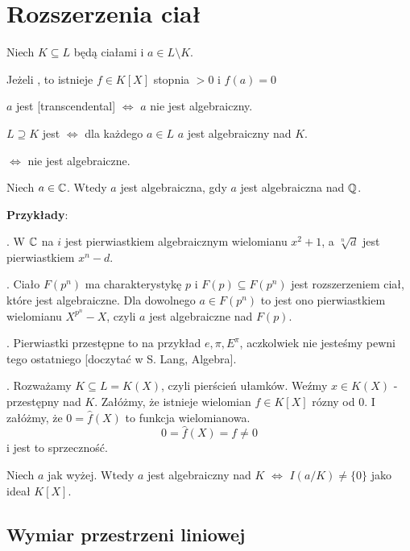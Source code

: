 \section{Rozszerzenia ciał}

\begin{definicja}
Niech $K\subseteq L$ będą ciałami i $a\in L\setminus K$.

\indent \point Jeżeli , to istnieje $f\in K[X]$ stopnia $>0$ i $f(a)=0$

\indent \point $a$ jest  [transcendental] $\iff$ $a$ nie jest algebraiczny.

\indent \point {} $L\supseteq K$ jest  $\iff$ dla każdego $a\in L$ $a$ jest algebraiczny nad $K$.

\indent \point {} $\iff$ nie jest algebraiczne.

\indent \point Niech $a\in \mathbb{C}$. Wtedy $a$ jest algebraiczna, gdy $a$ jest algebraiczna nad $\mathbb{Q}$.

\end{definicja}

\textbf{Przykłady}:

. W $\mathbb{C}$ na $i$ jest pierwiastkiem algebraicznym wielomianu $x^2+1$, a $\sqrt[n]{d}$ jest pierwiastkiem $x^n-d$. 

. Ciało $F(p^n)$ ma charakterystykę $p$ i $F(p)\subseteq F(p^n)$ jest rozszerzeniem ciał, które jest algebraiczne. Dla dowolnego $a\in F(p^n)$ to jest ono pierwiastkiem wielomianu $X^{p^n}-X$, czyli $a$ jest algebraiczne nad $F(p)$.

. Pierwiastki przestępne to na przykład $e,\pi,E^\pi$, aczkolwiek nie jesteśmy pewni tego ostatniego [doczytać w S. Lang, Algebra].

. Rozważamy $K\subseteq L=K(X)$, czyli pierścień ułamków. Weźmy $x\in K(X)$ - przestępny nad $K$. Załóżmy, że istnieje wielomian $f\in K[X]$ rózny od $0$. I załóżmy, że $0=\hat{f}(X)$ to funkcja wielomianowa. 
$$0=\hat{f}(X)=f\neq0$$
i jest to sprzeczność.


\begin{uwaga}
    Niech $a$ jak wyżej. Wtedy $a$ jest algebraiczny nad $K$ $\iff$ $I(a/K)\neq\{0\}$ jako ideał $K[X]$.
\end{uwaga}

\subsection{Wymiar przestrzeni liniowej}

